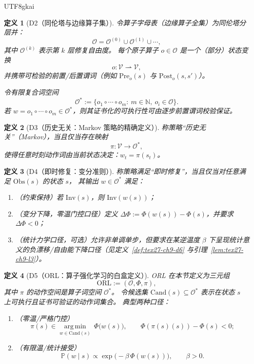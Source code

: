 \documentclass[12pt]{article}
\newtheorem{definition}{定义}[section]
\newcommand{\NN}{\mathbb{N}}
\begin{document}
\begin{CJK*}{UTF8}{gkai}
\begin{definition}[D2（同伦塔与边缘算子集）]
\label{def:tex27-ch9-d2}
令算子字母表（边缘算子全集）为同伦塔分层并：
\[
  \mathcal{O}=\mathcal{O}^{(0)}\cup \mathcal{O}^{(1)}\cup \cdots,
\]
其中 $\mathcal{O}^{(k)}$ 表示第 $k$ 层修复自由度。
每个原子算子 $o\in\mathcal{O}$ 是一个（部分）状态变换
\[
  o:\mathcal{V}\rightharpoonup \mathcal{V},
\]
并携带可检验的前置/后置谓词（例如 $\mathrm{Pre}_o(s)$ 与 $\mathrm{Post}_o(s,s')$）。

令有限复合词空间
\[
  \mathcal{O}^{*}
  :=\{o_1\circ\cdots\circ o_m:\ m\in\NN,\ o_i\in\mathcal{O}\}.
\]
若 $w=o_1\circ\cdots\circ o_m\in\mathcal{O}^*$，则其证书化的可执行性可由逐步前置谓词校验保证。
\end{definition}

\begin{definition}[D3（历史无关：Markov 策略的精确定义）]
\label{def:tex27-ch9-d3}
称策略“历史无关”（Markov），当且仅当存在映射
\[
  \pi:\mathcal{V}\to\mathcal{O}^{*},
\]
使得任意时刻动作词由当前状态决定：$w_t=\pi(s_t)$。
\end{definition}

\begin{definition}[D4（即时修复：变分准则）]
\label{def:tex27-ch9-d4}
称策略满足“即时修复”，当且仅当对任意满足 $\mathrm{Obs}(s)$ 的状态 $s$，
其输出 $w\in\mathcal{O}^*$ 满足：
\begin{enumerate}
  \item（约束保持）若 $\mathrm{Inv}(s)$，则 $\mathrm{Inv}(w(s))$；
  \item（变分下降，零温门控口径）定义 $\Delta\Phi:=\Phi(w(s))-\Phi(s)$，并要求 $\Delta\Phi<0$；
  \item（统计力学口径，可选）允许非单调单步，但要求在某逆温度 $\beta$ 下呈现统计意义的负漂移/自由能下降口径（见定义~\ref{def:tex27-ch9-d6} 与引理~\ref{lem:tex27-ch9-l3}）。
\end{enumerate}
\end{definition}

\begin{definition}[D5（ORL：算子强化学习的白盒定义）]
\label{def:tex27-ch9-d5}
ORL 在本节定义为三元组
\[
  \mathrm{ORL}:=(\mathcal{O},\Phi,\pi),
\]
其中 $\pi$ 的动作空间是算子词空间 $\mathcal{O}^*$。
令候选集 $\mathrm{Cand}(s)\subseteq\mathcal{O}^*$ 表示在状态 $s$ 上可执行且证书可验证的动作词集合。
典型两种口径：
\begin{enumerate}
  \item（零温/严格门控）
  \[
    \pi(s)\in \operatorname*{arg\,min}_{w\in\mathrm{Cand}(s)}\ \Phi\bigl(w(s)\bigr),
    \qquad
    \Phi(\pi(s)(s))-\Phi(s)<0;
  \]
  \item（有限温/统计接受）
  \[
    \mathbb{P}(w\mid s)\propto \exp\bigl(-\beta\,\Phi(w(s))\bigr),
    \qquad
    \beta>0.
  \]
\end{enumerate}
\end{definition}


\end{CJK*}
\end{document}
